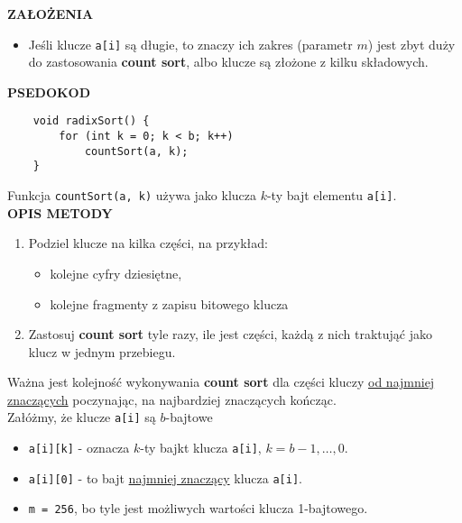 \documentclass[advanced-sorts.tex]{subfiles}
\begin{document}
    \textbf{ZAŁOŻENIA}
    \begin{itemize}
        \item Jeśli klucze \texttt{a[i]} są długie, to znaczy ich zakres
            (parametr $m$) jest zbyt duży do zastosowania \textbf{count sort},
            albo klucze są złożone z kilku składowych.
    \end{itemize}

    \textbf{PSEDOKOD}
    \begin{verbatim}
    void radixSort() {
        for (int k = 0; k < b; k++)
            countSort(a, k);
    }
   \end{verbatim}

   Funkcja \texttt{countSort(a, k)} używa jako klucza $k$-ty bajt elementu
   \texttt{a[i]}.\\

    \textbf{OPIS METODY}
    \begin{enumerate}
        \item Podziel klucze na kilka części, na przykład:
            \begin{itemize}
                \item kolejne cyfry dziesiętne,
                \item kolejne fragmenty z zapisu bitowego klucza
            \end{itemize}
        \item Zastosuj \textbf{count sort} tyle razy, ile jest części, każdą z
            nich traktująć jako klucz w jednym przebiegu.
    \end{enumerate}

    Ważna jest kolejność wykonywania \textbf{count sort} dla części kluczy
    \underline{od najmniej} \underline{znaczących} poczynając, na najbardziej
    znaczących kończąc.\\

    Załóżmy, że klucze \texttt{a[i]} są $b$-bajtowe
    \begin{itemize}
        \item \texttt{a[i][k]} - oznacza $k$-ty bajkt klucza \texttt{a[i]},
            $k = b - 1, \ldots, 0$.
        \item \texttt{a[i][0]} - to bajt \underline{najmniej znaczący} klucza
            \texttt{a[i]}.
        \item \texttt{m = 256}, bo tyle jest możliwych wartości klucza
            1-bajtowego.
    \end{itemize}
\end{document}
